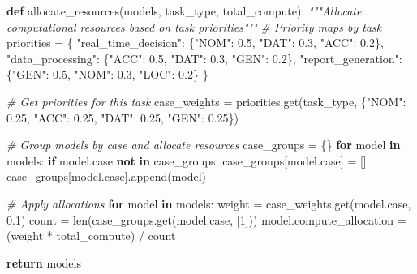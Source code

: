 \documentclass[
  11pt,
  letterpaper,
]{article}
\newenvironment{Shaded}{}{}
\newcommand{\BuiltInTok}[1]{#1}
\newcommand{\CommentTok}[1]{\textcolor[rgb]{0.38,0.63,0.69}{\textit{#1}}}
\newcommand{\ControlFlowTok}[1]{\textcolor[rgb]{0.00,0.44,0.13}{\textbf{#1}}}
\newcommand{\DecValTok}[1]{\textcolor[rgb]{0.25,0.63,0.44}{#1}}
\newcommand{\FloatTok}[1]{\textcolor[rgb]{0.25,0.63,0.44}{#1}}
\newcommand{\KeywordTok}[1]{\textcolor[rgb]{0.00,0.44,0.13}{\textbf{#1}}}
\newcommand{\NormalTok}[1]{#1}
\newcommand{\OperatorTok}[1]{\textcolor[rgb]{0.40,0.40,0.40}{#1}}
\newcommand{\StringTok}[1]{\textcolor[rgb]{0.25,0.44,0.63}{#1}}
\begin{document}
\begin{Shaded}
\begin{Highlighting}[]
\KeywordTok{def}\NormalTok{ allocate\_resources(models, task\_type, total\_compute):}
    \CommentTok{"""Allocate computational resources based on task priorities"""}
    \CommentTok{\# Priority maps by task}
\NormalTok{    priorities }\OperatorTok{=}\NormalTok{ \{}
        \StringTok{"real\_time\_decision"}\NormalTok{: \{}\StringTok{"NOM"}\NormalTok{: }\FloatTok{0.5}\NormalTok{, }\StringTok{"DAT"}\NormalTok{: }\FloatTok{0.3}\NormalTok{, }\StringTok{"ACC"}\NormalTok{: }\FloatTok{0.2}\NormalTok{\},}
        \StringTok{"data\_processing"}\NormalTok{: \{}\StringTok{"ACC"}\NormalTok{: }\FloatTok{0.5}\NormalTok{, }\StringTok{"DAT"}\NormalTok{: }\FloatTok{0.3}\NormalTok{, }\StringTok{"GEN"}\NormalTok{: }\FloatTok{0.2}\NormalTok{\},}
        \StringTok{"report\_generation"}\NormalTok{: \{}\StringTok{"GEN"}\NormalTok{: }\FloatTok{0.5}\NormalTok{, }\StringTok{"NOM"}\NormalTok{: }\FloatTok{0.3}\NormalTok{, }\StringTok{"LOC"}\NormalTok{: }\FloatTok{0.2}\NormalTok{\}}
\NormalTok{    \}}
    
    \CommentTok{\# Get priorities for this task}
\NormalTok{    case\_weights }\OperatorTok{=}\NormalTok{ priorities.get(task\_type, \{}\StringTok{"NOM"}\NormalTok{: }\FloatTok{0.25}\NormalTok{, }\StringTok{"ACC"}\NormalTok{: }\FloatTok{0.25}\NormalTok{, }\StringTok{"DAT"}\NormalTok{: }\FloatTok{0.25}\NormalTok{, }\StringTok{"GEN"}\NormalTok{: }\FloatTok{0.25}\NormalTok{\})}
    
    \CommentTok{\# Group models by case and allocate resources}
\NormalTok{    case\_groups }\OperatorTok{=}\NormalTok{ \{\}}
    \ControlFlowTok{for}\NormalTok{ model }\KeywordTok{in}\NormalTok{ models:}
        \ControlFlowTok{if}\NormalTok{ model.case }\KeywordTok{not} \KeywordTok{in}\NormalTok{ case\_groups:}
\NormalTok{            case\_groups[model.case] }\OperatorTok{=}\NormalTok{ []}
\NormalTok{        case\_groups[model.case].append(model)}
    
    \CommentTok{\# Apply allocations}
    \ControlFlowTok{for}\NormalTok{ model }\KeywordTok{in}\NormalTok{ models:}
\NormalTok{        weight }\OperatorTok{=}\NormalTok{ case\_weights.get(model.case, }\FloatTok{0.1}\NormalTok{)}
\NormalTok{        count }\OperatorTok{=} \BuiltInTok{len}\NormalTok{(case\_groups.get(model.case, [}\DecValTok{1}\NormalTok{]))}
\NormalTok{        model.compute\_allocation }\OperatorTok{=}\NormalTok{ (weight }\OperatorTok{*}\NormalTok{ total\_compute) }\OperatorTok{/}\NormalTok{ count}
    
    \ControlFlowTok{return}\NormalTok{ models}
\end{Highlighting}
\end{Shaded}
\end{document}
